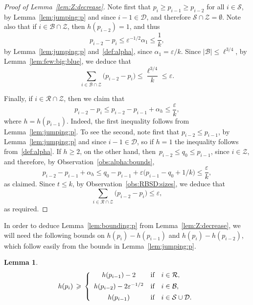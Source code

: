 \documentclass[12pt,reqno]{amsart}
\newtheorem{lemma}[theorem]{Lemma}
\theoremstyle{definition}
\theoremstyle{remark}
\newcommand\cB{\mathcal{B}}
\newcommand\cZ{\mathcal{Z}}
\def\cS{\mathcal{S}}
\newcommand\eps{\varepsilon}
\renewcommand{\le}{\leqslant}
\renewcommand{\ge}{\geqslant}
\def\eps{\varepsilon}
\def\cD{\mathcal{D}}
\def\cR{\mathcal{R}}
\def\cB{\mathcal{B}}
\begin{document}
\begin{proof}[Proof of Lemma~\ref{lem:Z:decrease}]
Note first that $p_i \ge p_{i-1} \ge p_{i-2}$ for all $i \in \cS$, by Lemma~\ref{lem:jumping:p} and since $i-1 \in \cD$, and therefore $\cS \cap \cZ = \emptyset$. Note also that if $i \in \cB \cap \cZ$, then $h(p_{i-2}) = 1$, and thus
$$p_{i-2} - p_i \le \eps^{-1/2} \alpha_1 \le \frac{1}{k},$$
by Lemma~\ref{lem:jumping:p} and~\eqref{def:alpha}, since $\alpha_1 = \eps/k$. Since $|\cB| \le \ell^{3/4}$, by Lemma~\ref{lem:few:big:blue}, we deduce that
$$\sum_{i \in \cB \cap \cZ} \big( p_{i-2} - p_i \big) \le \frac{\ell^{3/4}}{k} \le \eps.$$

Finally, if $i \in \cR \cap \cZ$, then we claim that 
$$p_{i-2} - p_i \le p_{i-2} - p_{i-1} + \alpha_h \le \frac{\eps}{k},$$
where $h = h(p_{i-1})$. Indeed, the first inequality follows from Lemma~\ref{lem:jumping:p}. To see the second, note first that $p_{i-2} \le p_{i-1}$, by Lemma~\ref{lem:jumping:p} and since $i - 1 \in \cD$, so if $h = 1$ the inequality follows from~\eqref{def:alpha}. If $h \ge 2$, on the other hand, then~$p_{i-2} \le q_0 \le p_{i-1}$, since $i \in \cZ$, and therefore, by Observation~\ref{obs:alpha:bounds},
$$p_{i-2} - p_{i-1} + \alpha_h \le q_0 - p_{i-1} + \eps\big( p_{i-1} - q_0 + 1/k \big) \le \frac{\eps}{k},$$
as claimed. Since $t \le k$, by Observation~\ref{obs:RBSD:sizes}, we deduce that
$$\sum_{i \in \cR \cap \cZ} \big( p_{i-2} - p_i \big) \le \eps,$$
as required.
\end{proof}

In order to deduce Lemma~\ref{lem:bounding:p} from Lemma~\ref{lem:Z:decrease}, we will need the following bounds on $h(p_i) - h(p_{i-1})$ and $h(p_i) - h(p_{i-2})$, which follow easily from the bounds in Lemma~\ref{lem:jumping:p}. 

\begin{lemma}\label{lem:jumping:down}
\[
    h(p_i) \,\ge\, \left\{
    \begin{array} {c@{\quad \textup{if} \quad}l}
      h(p_{i-1}) - 2 & i \in \cR, \\[+1ex]
      h(p_{i-2}) - 2 \eps^{-1/2} & i \in \cB, \\[+1ex]
      h(p_{i-1}) & i \in \cS \cup \cD.
    \end{array}\right.
  \]
\end{lemma}
\end{document}
